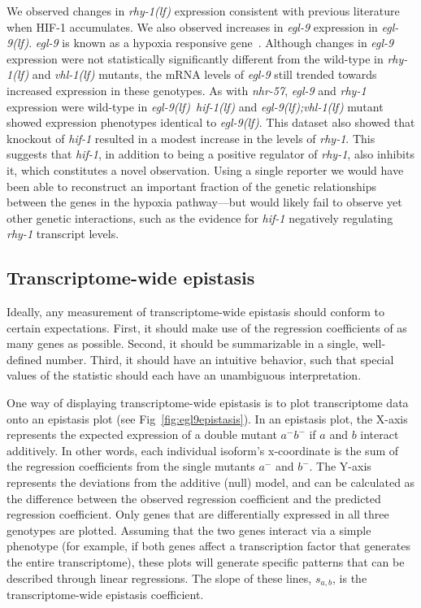 \documentclass[9pt,twocolumn,twoside]{pnas-new}
\newcommand{\gene}[1]{\emph{#1}}
\newcommand{\nhr}{\emph{\mbox{nhr-57}}}
\newcommand{\egl}{\emph{\mbox{egl-9}(lf)}}
\newcommand{\rhy}{\emph{\mbox{rhy-1}(lf)}}
\newcommand{\vhl}{\emph{\mbox{vhl-1}(lf)}}
\newcommand{\eglvhl}{\emph{\mbox{egl-9(lf);vhl-1(lf)}}}
\newcommand{\eglhif}{\emph{\mbox{egl-9(lf)}~\mbox{hif-1(lf)}}}
\newcommand{\hifp}{HIF-1}
\begin{document}
We observed changes in \rhy{} expression consistent with previous
literature~\cite{Shen2006} when \hifp{} accumulates.
We also observed increases in \gene{egl-9} expression in \egl{}.
\gene{egl-9} is known as a hypoxia responsive gene~\cite{Powell-Coffman2010}.
Although changes in \gene{egl-9} expression were not statistically significantly
different from the wild-type in
\rhy{} and \vhl{} mutants, the mRNA levels of \gene{egl-9} still trended towards
increased expression in these genotypes.
As with \nhr{}, \gene{egl-9} and \gene{rhy-1} expression were wild-type in
\eglhif{} and \eglvhl{} mutant showed expression phenotypes identical to \egl{}.
This dataset also showed that knockout of \gene{hif-1} resulted in a modest
increase in the levels of \gene{rhy-1}. This suggests that \gene{hif-1}, in
addition to being a positive regulator of \gene{rhy-1}, also inhibits it, which
constitutes a novel observation.
Using a single reporter we would have been able to reconstruct an
important fraction of the genetic relationships between the genes in the hypoxia
pathway–--but would likely fail to observe yet other genetic interactions, such as
the evidence for \gene{hif-1} negatively regulating \gene{rhy-1} transcript levels.

\subsection*{Transcriptome-wide epistasis}
Ideally, any measurement of transcriptome-wide epistasis should conform to certain
expectations. First, it should make use of the regression coefficients of as
many genes as possible. Second, it should be summarizable in a single,
well-defined number. Third, it should have an intuitive behavior, such that
special values of the statistic should each have an unambiguous interpretation.

One way of displaying transcriptome-wide epistasis is to plot transcriptome data onto
an epistasis plot (see Fig~\ref{fig:egl9epistasis}). In an epistasis plot, the
X-axis represents the expected expression of a double mutant $a^-b^-$ if $a$
and $b$ interact additively.
In other words, each individual isoform's x-coordinate is the sum of the regression
coefficients from the single mutants $a^-$ and $b^-$.
The Y-axis represents the deviations from the additive (null) model, and
can be calculated as the difference between the observed regression coefficient
and the predicted regression coefficient. Only genes that are differentially
expressed in all three genotypes are plotted. Assuming that the two genes interact
via a simple phenotype (for example, if both genes affect a transcription factor
that generates the entire transcriptome), these plots will generate specific
patterns that can be described through linear regressions. The slope of these
lines, $s_{a,b}$, is the transcriptome-wide epistasis coefficient.
\end{document}
